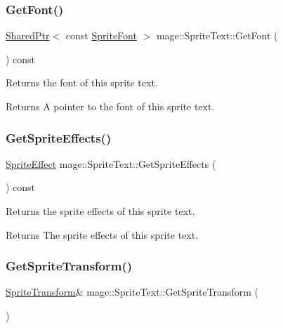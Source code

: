 \subsubsection{\texorpdfstring{Get\+Font()}{GetFont()}}
{\footnotesize\ttfamily \hyperlink{namespacemage_a1e01ae66713838a7a67d30e44c67703e}{Shared\+Ptr}$<$ const \hyperlink{classmage_1_1_sprite_font}{Sprite\+Font} $>$ mage\+::\+Sprite\+Text\+::\+Get\+Font (\begin{DoxyParamCaption}{ }\end{DoxyParamCaption}) const\hspace{0.3cm}{\ttfamily [noexcept]}}

Returns the font of this sprite text.

\begin{DoxyReturn}{Returns}
A pointer to the font of this sprite text. 
\end{DoxyReturn}
\hypertarget{classmage_1_1_sprite_text_a2bd9f195c3c31906c2b3dbf276f5bc97}{}\label{classmage_1_1_sprite_text_a2bd9f195c3c31906c2b3dbf276f5bc97} 
\subsubsection{\texorpdfstring{Get\+Sprite\+Effects()}{GetSpriteEffects()}}
{\footnotesize\ttfamily \hyperlink{namespacemage_ad62ebdf0e7aae0caf1535a4ea3f056ea}{Sprite\+Effect} mage\+::\+Sprite\+Text\+::\+Get\+Sprite\+Effects (\begin{DoxyParamCaption}{ }\end{DoxyParamCaption}) const\hspace{0.3cm}{\ttfamily [noexcept]}}

Returns the sprite effects of this sprite text.

\begin{DoxyReturn}{Returns}
The sprite effects of this sprite text. 
\end{DoxyReturn}
\hypertarget{classmage_1_1_sprite_text_af2d7d48fd0134a9d713c3a4820ac09ba}{}\label{classmage_1_1_sprite_text_af2d7d48fd0134a9d713c3a4820ac09ba} 
\subsubsection{\texorpdfstring{Get\+Sprite\+Transform()}{GetSpriteTransform()}\hspace{0.1cm}{\footnotesize\ttfamily [1/2]}}
{\footnotesize\ttfamily \hyperlink{classmage_1_1_sprite_transform}{Sprite\+Transform}\& mage\+::\+Sprite\+Text\+::\+Get\+Sprite\+Transform (\begin{DoxyParamCaption}{ }\end{DoxyParamCaption})\hspace{0.3cm}{\ttfamily [noexcept]}}

